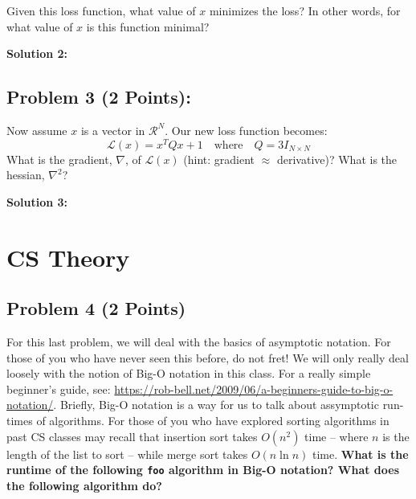 \documentclass[]{article}
\begin{document}
Given this loss function, what value of $x$ minimizes the loss?  In other words, for what value of $x$ is this function minimal?

\bigskip
\textbf{Solution 2:}

\bigskip
\bigskip
\bigskip
\bigskip
\bigskip

\subsection*{Problem 3 (2 Points):}
Now assume $x$ is a vector in $\mathcal{R}^N$. Our new loss function becomes:
$$\mathcal{L}(x) = x^TQx + 1 \quad \text{where} \quad Q = 3I_{N \times N}$$
What is the gradient, $\nabla$, of $\mathcal{L}(x)$ (hint: gradient $\approx$ derivative)? What is the hessian, $\nabla^2$?

\bigskip
\textbf{Solution 3:}

\clearpage
\section{CS Theory}
\subsection*{Problem 4 (2 Points)}
For this last problem, we will deal with the basics of asymptotic notation. For those of you who have never seen this before, do not fret!  We will only really deal loosely with the notion of Big-O notation in this class.  For a really simple beginner's guide, see: \url{https://rob-bell.net/2009/06/a-beginners-guide-to-big-o-notation/}. Briefly, Big-O notation is a way for us to talk about assymptotic run-times of algorithms. For those of you who have explored sorting algorithms in past CS classes may recall that insertion sort takes $O(n^2)$ time -- where $n$ is the length of the list to sort -- while merge sort takes $O(n\ln n)$ time. \textbf{What is the runtime of the following \texttt{foo} algorithm in Big-O notation?  What does the following algorithm do?}
\end{document}
